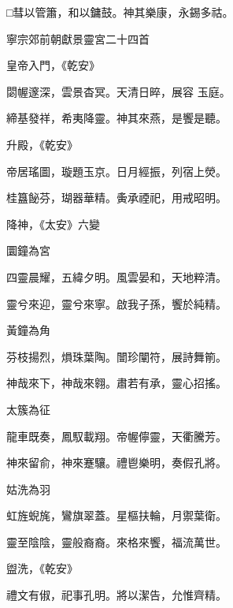 \begin{pinyinscope}
 □彗以管簫，和以鏞鼓。神其樂康，永錫多祜。



 寧宗郊前朝獻景靈宮二十四首



 皇帝入門，《乾安》



 閟幄邃深，雲景杳冥。天清日晬，展容
 玉庭。



 締基發祥，希夷降靈。神其來燕，是饗是聽。



 升殿，《乾安》



 帝居瑤圖，璇題玉京。日月經振，列宿上熒。



 桂簋飶芬，瑚器華精。夤承禋祀，用戒昭明。



 降神，《太安》六變



 圜鐘為宮



 四靈晨耀，五緯夕明。風雲晏和，天地粹清。



 靈兮來迎，靈兮來寧。啟我子孫，饗於純精。



 黃鐘為角



 芬枝揚烈，熉珠葉陶。闓珍闡符，展詩舞箾。



 神哉來下，神哉來翱。肅若有承，靈心招搖。



 太簇為征



 龍車既奏，鳳馭載翔。帝幄儜靈，天衢騰芳。



 神來留俞，神來蹇驤。禮鬯樂明，奏假孔將。



 姑洗為羽



 虹旌蜺旄，鸞旗翠蓋。星樞扶輪，月禦葉衛。



 靈至陰陰，靈般裔裔。來格來饗，福流萬世。



 盥洗，《乾安》



 禮文有俶，祀事孔明。將以潔告，允惟齊精。




\end{pinyinscope}
